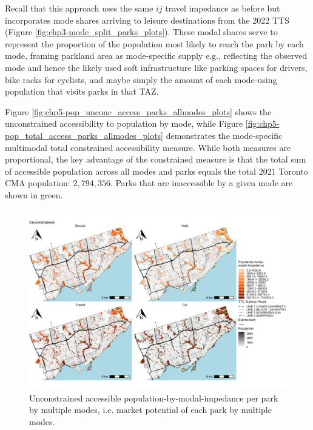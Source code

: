 \documentclass[
11pt, %
oneside, %
english, %
singlespacing, %
]{macthesis} %
\begin{document}
Recall that this approach uses the same \(ij\) travel impedance as before but incorporates mode shares arriving to leisure destinations from the 2022 TTS (Figure \ref{fig:chp3-mode_split_parks_plots}). These modal shares serve to represent the proportion of the population most likely to reach the park by each mode, framing parkland area as mode-specific supply e.g., reflecting the observed mode and hence the likely used soft infrastructure like parking spaces for drivers, bike racks for cyclists, and maybe simply the amount of each mode-using population that visits parks in that TAZ.

Figure \ref{fig:chp5-pop_unconc_access_parks_allmodes_plots} shows the unconstrained accessibility to population by mode, while Figure \ref{fig:chp5-pop_total_access_parks_allmodes_plots} demonstrates the mode-specific multimodal total constrained accessibility measure. While both measures are proportional, the key advantage of the constrained measure is that the total sum of accessible population across all modes and parks equals the total 2021 Toronto CMA population: \(2,794,356\). Parks that are inaccessible by a given mode are shown in green.

\begin{figure}

{\centering \includegraphics[width=6in]{./data/figures/chp5-pop_unconc_access_parks_allmodes_plots} 

}

\caption{\label{fig:chp5-pop_unconc_access_parks_allmodes_plots} Unconstrained accessible population-by-modal-impedance per park by multiple modes, i.e. market potential of each park by multiple modes.}\label{fig:unnamed-chunk-86}
\end{figure}
\end{document}
